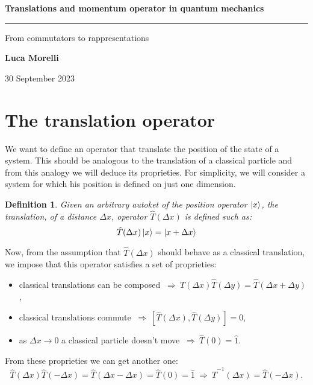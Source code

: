 \documentclass[11pt,a4paper,english]{article}
\newtheorem{definition}{Definition}[section]
\numberwithin{equation}{section}
\begin{document}
\begin{center}
    
\LARGE \textbf{Translations and momentum operator in quantum mechanics}
	
\rule{7cm}{0.4pt} 

\Large From commutators to rappresentations

\vspace{10pt}

\large \textbf{Luca Morelli}

\vspace{5pt}

\large 30 September 2023

\end{center}

\section{The translation operator}
We want to define an operator that translate the position of the state of a system. This should be analogous to the translation of a classical particle and from this analogy we will deduce its proprieties. For simplicity, we will consider a system for which his position is defined on just one dimension.
\begin{definition}
    Given an arbitrary autoket of the position operator $\ket{x}$, the translation, of a distance $\Delta x$, operator $\hat T(\Delta x)$ is defined such as:
    \begin{equation}
        \hat T(\Delta x)\ket{x}=\ket{x+\Delta x}
    \end{equation}
\end{definition}
Now, from the assumption that $\hat T(\Delta x)$ should behave as a classical translation, we impose that this operator satisfies a set of proprieties:
\begin{itemize}
    \item classical translations can be composed $\ \Rightarrow\  \hat T(\Delta x)\hat T(\Delta y)=\hat T(\Delta x+\Delta y)$,
    \item classical translations commute $\ \Rightarrow\  [\hat T(\Delta x),\hat T(\Delta y)]=0$,
    \item as $\Delta x\rightarrow0$ a classical particle doesn't move $\ \Rightarrow\  \hat T(0)=\hat 1$.
\end{itemize}
From these proprieties we can get another one:
\begin{equation*}
    \hat T(\Delta x)\hat T(-\Delta x)=\hat T(\Delta x-\Delta x)=\hat T(0)=\hat 1 \ \Rightarrow \ \hat T^{-1}(\Delta x)=\hat T(-\Delta x).
\end{equation*}
\end{document}
